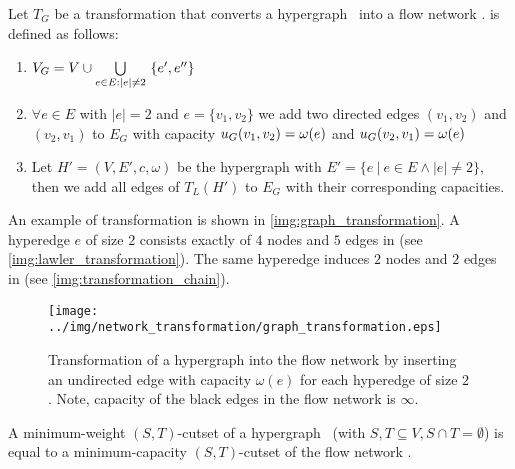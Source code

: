 \begin{definition}
Let $T_G$ be a transformation that converts a hypergraph \HypergraphDef~into 
a flow network .  is defined as follows:
\begin{enumerate}
\item $V_G = V \cup \bigcup\limits_{\substack{e \in E: |e| \neq 2}}\ \{e', e''\}$
\item $\forall e \in E$ with $|e| = 2$ and $e = \{v_1,v_2\}$ we add 
      two directed edges $(v_1,v_2)$ and $(v_2,v_1)$ to $E_G$ with capacity $u_G(v_1,v_2) = \omega(e)$
      and $u_G(v_2,v_1) = \omega(e)$
\item Let $H' = (V,E',c,\omega)$ be the hypergraph with $E' = \{e\ |\ e \in E \land |e| \neq 2\}$,
      then we add all edges of $T_L(H')$ to $E_G$ with their corresponding capacities.
\end{enumerate} 
\end{definition}

An example of transformation  is shown in \autoref{img:graph_transformation}. A hyperedge
$e$ of size $2$ consists exactly of $4$ nodes and $5$ edges in  (see \autoref{img:lawler_transformation}).
The same hyperedge induces $2$ nodes and $2$ edges in  (see \autoref{img:transformation_chain}). 
 
\begin{figure}
\centering
\texttt{[image: ../img/network\_transformation/graph\_transformation.eps]}
\caption{Transformation of a hypergraph into the flow network  by inserting 
         an undirected edge with capacity $\omega(e)$ for each hyperedge of size $2$. 
         Note, capacity of the black edges in the flow network is $\infty$.}
\label{img:graph_transformation}
\end{figure}

\begin{theorem}
A minimum-weight $(S,T)$-cutset of a hypergraph \HypergraphDef~(with $S,T \subseteq V,
S \cap T = \emptyset$) is equal to a minimum-capacity $(S,T)$-cutset of the
flow network .
\label{theorem:graph_transformation}
\end{theorem}

